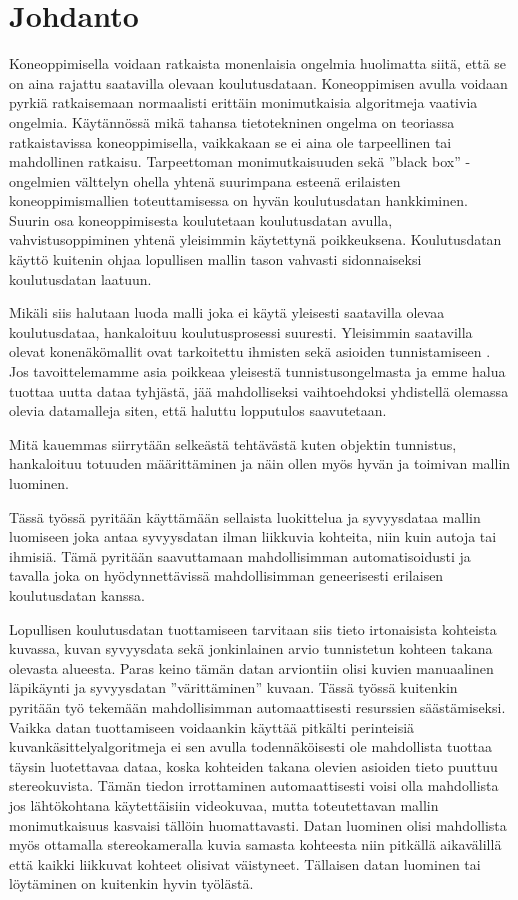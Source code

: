 \chapter{Johdanto}%
\label{ch:johdanto}

Koneoppimisella voidaan ratkaista monenlaisia ongelmia huolimatta siitä, että se on aina rajattu saatavilla olevaan koulutusdataan.
Koneoppimisen avulla voidaan pyrkiä ratkaisemaan normaalisti erittäin monimutkaisia algoritmeja vaativia ongelmia.
Käytännössä mikä tahansa tietotekninen ongelma on teoriassa ratkaistavissa koneoppimisella,
vaikkakaan se ei aina ole tarpeellinen tai mahdollinen ratkaisu.
Tarpeettoman monimutkaisuuden sekä ”black box” -ongelmien välttelyn ohella
yhtenä suurimpana esteenä erilaisten koneoppimismallien toteuttamisessa on hyvän koulutusdatan hankkiminen.
Suurin osa koneoppimisesta koulutetaan koulutusdatan avulla, vahvistusoppiminen \cite{alma9911523590705973} yhtenä yleisimmin käytettynä poikkeuksena. 
Koulutusdatan käyttö kuitenin ohjaa lopullisen mallin tason vahvasti sidonnaiseksi koulutusdatan laatuun.

Mikäli siis halutaan luoda malli joka ei käytä yleisesti saatavilla olevaa koulutusdataa,
hankaloituu koulutusprosessi suuresti.
Yleisimmin saatavilla olevat konenäkömallit ovat tarkoitettu ihmisten sekä asioiden tunnistamiseen \cite{kagglecomvis}.
Jos tavoittelemamme asia poikkeaa yleisestä tunnistusongelmasta ja emme halua tuottaa uutta dataa tyhjästä, 
jää mahdolliseksi vaihtoehdoksi yhdistellä olemassa olevia datamalleja siten, 
että haluttu lopputulos saavutetaan.

Mitä kauemmas siirrytään selkeästä tehtävästä kuten objektin tunnistus,
hankaloituu totuuden määrittäminen ja näin ollen myös hyvän ja toimivan mallin luominen.

Tässä työssä pyritään käyttämään sellaista luokittelua ja syvyysdataa mallin luomiseen joka antaa syvyysdatan
ilman liikkuvia kohteita, niin kuin autoja tai ihmisiä.
Tämä pyritään saavuttamaan mahdollisimman automatisoidusti
ja tavalla joka on hyödynnettävissä mahdollisimman geneerisesti erilaisen koulutusdatan kanssa.

Lopullisen koulutusdatan tuottamiseen tarvitaan siis tieto irtonaisista kohteista kuvassa,
kuvan syvyysdata sekä jonkinlainen arvio tunnistetun kohteen takana olevasta alueesta.
Paras keino tämän datan arviontiin olisi kuvien manuaalinen läpikäynti ja syvyysdatan ”värittäminen” kuvaan.
Tässä työssä kuitenkin pyritään työ tekemään mahdollisimman automaattisesti resurssien säästämiseksi.
Vaikka datan tuottamiseen voidaankin käyttää pitkälti perinteisiä kuvankäsittelyalgoritmeja
ei sen avulla todennäköisesti ole mahdollista tuottaa täysin luotettavaa dataa,
koska kohteiden takana olevien asioiden tieto puuttuu stereokuvista.
Tämän tiedon irrottaminen automaattisesti voisi olla mahdollista jos lähtökohtana käytettäisiin videokuvaa,
mutta toteutettavan mallin monimutkaisuus kasvaisi tällöin huomattavasti.
Datan luominen olisi mahdollista myös ottamalla stereokameralla kuvia samasta kohteesta niin pitkällä aikavälillä että kaikki liikkuvat kohteet olisivat väistyneet.
Tällaisen datan luominen tai löytäminen on kuitenkin hyvin työlästä. 

